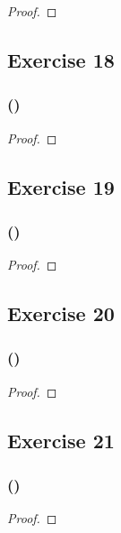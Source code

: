 \documentclass[14pt]{extarticle}
\begin{document}
\begin{proof}

\end{proof}

\subsection{Exercise 18}

\subsubsection{()}

\begin{proof}

\end{proof}

\subsection{Exercise 19}

\subsubsection{()}

\begin{proof}

\end{proof}

\subsection{Exercise 20}

\subsubsection{()}

\begin{proof}

\end{proof}

\subsection{Exercise 21}

\subsubsection{()}

\begin{proof}

\end{proof}
\end{document}
